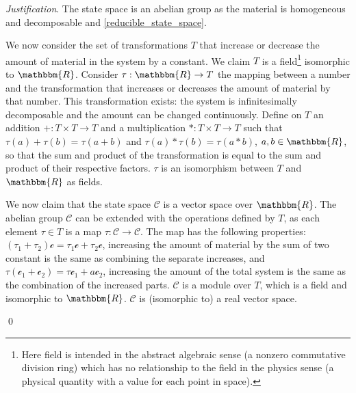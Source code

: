\documentclass[aps,pra,10pt,twocolumn,floatfix,nofootinbib]{revtex4-1}
\theoremstyle{definition}
\newenvironment{justification}{\emph{Justification}.}{\qed}
\begin{document}
\begin{justification}
The state space is an abelian group as the material is homogeneous and decomposable and \ref{reducible_state_space}.

We now consider the set of transformations $T$ that increase or decrease the amount of material in the system by a constant. We claim $T$ is a field\footnote{Here field is intended in the abstract algebraic sense (a nonzero commutative division ring) which has no relationship to the field in the physics sense (a physical quantity with a value for each point in space).} isomorphic to $\mathbbm{R}$. Consider $\tau: \mathbbm{R} \rightarrow T$ the mapping between a number and the transformation that increases or decreases the amount of material by that number. This transformation exists: the system is infinitesimally decomposable and the amount can be changed continuously. Define on $T$ an addition $+: T \times T \rightarrow T$ and a multiplication $*: T \times T \rightarrow T$ such that $\tau(a) + \tau(b) = \tau(a+b)$ and $\tau(a) * \tau(b) = \tau(a*b)$, $a,b \in \mathbbm{R}$, so that the sum and product of the transformation is equal to the sum and product of their respective factors. $\tau$ is an isomorphism between $T$ and $\mathbbm{R}$ as fields.

We now claim that the state space $\mathcal{C}$ is a vector space over $\mathbbm{R}$. The abelian group $\mathcal{C}$ can be extended with the operations defined by $T$, as each element $\tau \in T$ is a map $\tau : \mathcal{C} \rightarrow \mathcal{C}$. The map has the following properties: $(\tau_1 + \tau_2) \mathcal{c} = \tau_1 \mathcal{c} + \tau_2 \mathcal{c}$, increasing the amount of material by the sum of two constant is the same as combining the separate increases, and $\tau (\mathcal{c}_1 + \mathcal{c}_2) = \tau \mathcal{c}_1 + a \mathcal{c}_2$, increasing the amount of the total system is the same as the combination of the increased parts. $\mathcal{C}$ is a module over $T$, which is a field and isomorphic to $\mathbbm{R}$. $\mathcal{C}$ is (isomorphic to) a real vector space.


\end{justification}
\end{document}
